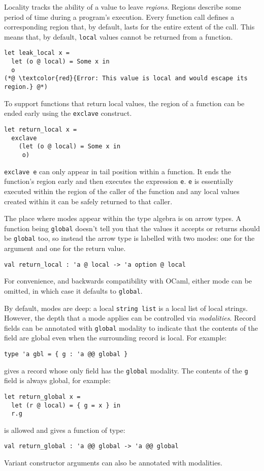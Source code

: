 \documentclass[acmsmall, screen, nonacm]{acmart}
\begin{document}
Locality tracks the ability of a value to leave \emph{regions}.  Regions
describe some period of time during a program's execution. Every
function call defines a corresponding region that, by default, lasts for
the entire extent of the call. This means that, by default,
\lstinline[style=ocaml]{local} values cannot be returned from a
function.
\begin{lstlisting}[style=ocaml]
let leak_local x =
  let (o @ local) = Some x in
  o
(*@ \textcolor{red}{Error: This value is local and would escape its region.} @*)
\end{lstlisting}

To support functions that return local values, the region of a function
can be ended early using the \lstinline[style=ocaml]{exclave} construct.
\begin{lstlisting}[style=ocaml]
let return_local x =
  exclave
    (let (o @ local) = Some x in
     o)
\end{lstlisting}
\lstinline[style=ocaml]{exclave e} can only appear in tail position
within a function.  It ends the function's region early and then
executes the expression
\lstinline[style=ocaml]{e}. \lstinline[style=ocaml]{e} is essentially
executed within the region of the caller of the function and any local
values created within it can be safely returned to that caller.

The place where modes appear within the type algebra is on arrow
types. A function being \lstinline[style=ocaml]{global} doesn't tell you
that the values it accepts or returns should be
\lstinline[style=ocaml]{global} too, so instead the arrow type is
labelled with two modes: one for the argument and one for the return
value.
\begin{lstlisting}[style=ocaml]
val return_local : 'a @ local -> 'a option @ local
\end{lstlisting}
For convenience, and backwards compatibility with OCaml, either mode can
be omitted, in which case it defaults to
\lstinline[style=ocaml]{global}.

By default, modes are deep: a local \lstinline[style=ocaml]{string list}
is a local list of local strings. However, the depth that a mode applies
can be controlled via \emph{modalities}. Record fields can be annotated
with \lstinline[style=ocaml]{global} modality to indicate that the
contents of the field are global even when the surrounding record is
local. For example:
\begin{lstlisting}[style=ocaml]
type 'a gbl = { g : 'a @@ global }
\end{lstlisting}
gives a record whose only field has the \lstinline[style=ocaml]{global}
modality. The contents of the \lstinline[style=ocaml]{g} field is always
global, for example:
\begin{lstlisting}[style=ocaml]
let return_global x =
  let (r @ local) = { g = x } in
  r.g
\end{lstlisting}
is allowed and gives a function of type:
\begin{lstlisting}[style=ocaml]
val return_global : 'a @@ global -> 'a @@ global
\end{lstlisting}
Variant constructor arguments can also be annotated with modalities.
\end{document}
